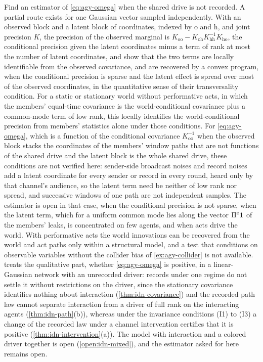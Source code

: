 \begin{openproblem}\label{open:agy-unrecorded-drive}
Find an estimator of \eqref{eq:agy-omega} when the shared drive is not recorded. A partial route exists for one Gaussian vector sampled independently. With an observed block and a latent block of coordinates, indexed by $\mathrm o$ and $\mathrm h$, and joint precision $K$, the precision of the observed marginal is $K_{\mathrm{oo}}-K_{\mathrm{oh}}K_{\mathrm{hh}}^{-1}K_{\mathrm{ho}}$, the conditional precision given the latent coordinates minus a term of rank at most the number of latent coordinates, and \citet{chandrasekaran2012latent} show that the two terms are locally identifiable from the observed covariance, and are recovered by a convex program, when the conditional precision is sparse and the latent effect is spread over most of the observed coordinates, in the quantitative sense of their transversality condition. For a static or stationary world without performative acts, in which the members' equal-time covariance is the world-conditional covariance plus a common-mode term of low rank, this locally identifies the world-conditional precision from members' statistics alone under those conditions. For \eqref{eq:agy-omega}, which is a function of the conditional covariance $K_{\mathrm{oo}}^{-1}$ when the observed block stacks the coordinates of the members' window paths that are not functions of the shared drive and the latent block is the whole shared drive, these conditions are not verified here: sender-side broadcast noises and record noises add a latent coordinate for every sender or record in every round, heard only by that channel's audience, so the latent term need be neither of low rank nor spread, and successive windows of one path are not independent samples. The estimator is open in that case, when the conditional precision is not sparse, when the latent term, which for a uniform common mode lies along the vector $\Pi^c\mathbf{1}$ of the members' leaks, is concentrated on few agents, and when acts drive the world. With performative acts the world innovations can be recovered from the world and act paths only within a structural model, and a test that conditions on observable variables without the collider bias of \cref{ex:agy-collider} is not available.  treats the qualitative part, whether \eqref{eq:agy-omega} is positive, in a linear-Gaussian network with an unrecorded driver: records under one regime do not settle it without restrictions on the driver, since the stationary covariance identifies nothing about interaction (\cref{thm:idn-covariance}) and the recorded path law cannot separate interaction from a driver of full rank on the interacting agents (\cref{thm:idn-path}(b)), whereas under the invariance conditions (I1) to (I3) a change of the recorded law under a channel intervention certifies that it is positive (\cref{thm:idn-intervention}(a)). The model with interaction and a colored driver together is open (\cref{open:idn-mixed}), and the estimator asked for here remains open.
\end{openproblem}

